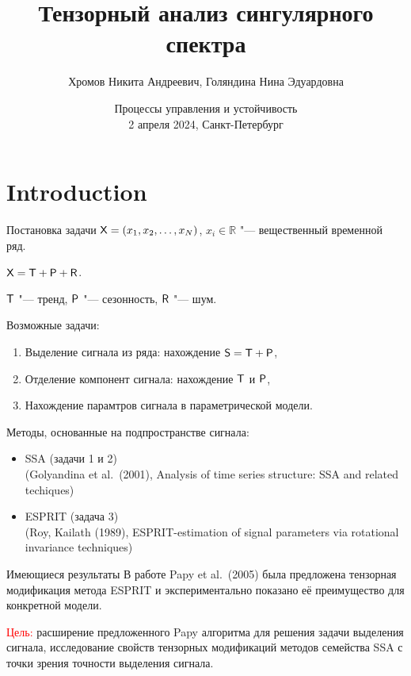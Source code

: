 \documentclass[ucs, notheorems, handout]{beamer}
\title[Tensor SSA]{Тензорный анализ сингулярного спектра}
\author[Хромов Н.А., Голяндина Н.Э.]{Хромов Никита Андреевич, Голяндина Нина Эдуардовна}
\institute[Санкт-Петербургский Государственный Университет]{%
    \small
    Санкт-Петербургский государственный университет\\
    Математико-механический факультет\\
    Кафедра статистического моделирования\\
    \vspace{1.25cm}
}
\date{Процессы управления и устойчивость\\
2 апреля 2024, Санкт-Петербург}
\newcommand{\bluetext}[1]{{\usebeamercolor[fg]{bluetext_color}#1}}
\begin{document}
    \begin{frame}[plain]
        \titlepage

    \end{frame}


    \section{Introduction}\label{sec:introduction}
    \begin{frame}{Постановка задачи}
        $\mathsf{X}=(x_1, x_2,\ldots, x_N)$, $x_i\in \mathbb{R}$ "--- вещественный временной ряд.

        $\mathsf{X} = \mathsf{T} + \mathsf{P} + \mathsf{R}$.

        $\mathsf{T}$ "--- тренд, $\mathsf{P}$ "--- сезонность, $\mathsf{R}$ "--- шум.
        \vspace{0.3cm}

        \bluetext{Возможные задачи:}
        \begin{enumerate}
            \item Выделение сигнала из ряда: нахождение $\mathsf{S} = \mathsf{T} + \mathsf{P}$,
            \item Отделение компонент сигнала: нахождение $\mathsf{T}$ и $\mathsf{P}$,
            \item Нахождение парамтров сигнала в параметрической модели.
        \end{enumerate}

        \vspace{0.3cm}
        Методы, основанные на подпространстве сигнала:
        \begin{itemize}
            \item SSA (задачи 1 и 2)
            \\(Golyandina et al.\ (2001), Analysis of time series structure: SSA and related techiques)
            \item ESPRIT (задача 3)
            \\(Roy, Kailath (1989), ESPRIT-estimation of signal parameters via rotational invariance techniques)
        \end{itemize}
    \end{frame}

    \begin{frame}{Имеющиеся результаты}
        В работе Papy et al.\ (2005) была предложена тензорная модификация метода ESPRIT и экспериментально показано её
        преимущество для конкретной модели.

        \vspace{0.6cm}

        \textcolor{red}{Цель:} расширение предложенного Papy алгоритма для решения задачи выделения сигнала,
        исследование свойств тензорных модификаций методов семейства SSA с точки зрения
        точности выделения сигнала.
    \end{frame}
\end{document}
